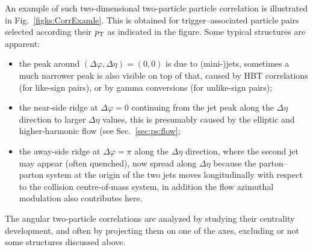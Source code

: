 An example of such two-dimensional two-particle particle correlation is illustrated in Fig.~\ref{figks:CorrExamle}. This is obtained for trigger--associated particle pairs selected according their $p_{\rm T}$ as indicated in the figure. Some typical structures are apparent:
\begin{itemize}
 \item{the peak around $(\Delta\varphi,\Delta\eta) = (0,0)$ is due to (mini-)jets, sometimes a much narrower peak is also visible on top of that, caused by HBT correlations (for like-sign pairs), or by gamma conversions (for unlike-sign pairs);}
 \item{the near-side ridge at $\Delta\varphi = 0$ continuing from the jet peak along the $\Delta\eta$ direction to larger $\Delta\eta$ values, this is presumably caused by the elliptic and higher-harmonic flow (see Sec.~\ref{sec:ps:flow};}
 \item{the away-side ridge at $\Delta\varphi = \pi$ along the $\Delta\eta$ direction, where the second jet may appear (often quenched), now spread along $\Delta\eta$ because the parton--parton system at the origin of the two jets moves longitudinally with respect to the collision centre-of-mass system, in addition the flow azimuthal modulation also contributes here.}
\end{itemize}
The angular two-particle correlations are analyzed by studying their centrality development, and often by projecting them on one of the axes, excluding or not some structures discussed above.

